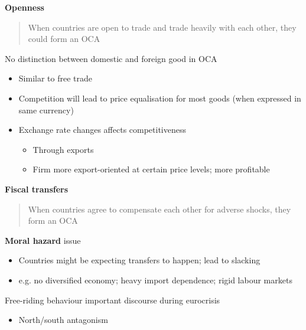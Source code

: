 \documentclass{beamer}
\begin{document}
\begin{frame}
  \textbf{Openness} 
  \begin{quote}
    When countries are open to trade and trade heavily with each other, they could form an OCA
  \end{quote}
  \medskip
   No distinction between domestic and foreign good in OCA
  \begin{itemize}
    \item Similar to free trade 
    \item Competition will lead to price equalisation for most goods (when expressed in same currency)
    \item Exchange rate changes affects competitiveness 
    \begin{itemize}
      \item Through exports
      \item Firm more export-oriented at certain price levels; more profitable
    \end{itemize}    
  \end{itemize}
\end{frame}


\begin{frame}
  \textbf{Fiscal transfers} 
  \begin{quote}
    When countries agree to compensate each other for adverse shocks, they form an OCA
  \end{quote}
  \medskip
   \textbf{Moral hazard} issue  
  \begin{itemize}
    \item Countries might be expecting transfers to happen; lead to slacking
    \item e.g. no diversified economy; heavy import dependence; rigid labour markets
  \end{itemize}
  \medskip
  Free-riding behaviour important discourse during eurocrisis
  \begin{itemize}
    \item North/south antagonism
  \end{itemize}
\end{frame}
\end{document}
